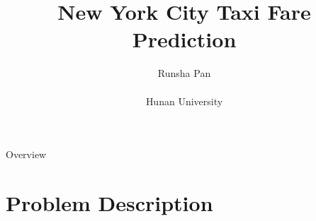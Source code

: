 \documentclass[
 size=14pt,
 paper=smartboard,  %
 mode=present, 		%
 display=slides, 	%
 style=tuliplab,  	%
 pauseslide,
 fleqn,leqno]{powerdot}
\title{New York City Taxi Fare Prediction}
\author{
Runsha Pan
\\
\\Hunan University
}
\date{\gitCommitterDate}
\begin{document}
\maketitle



\begin{slide}[toc=,bm=]{Overview}
\tableofcontents[content=currentsection,type=1]
\end{slide}


\section{Problem Description}
\end{document}
